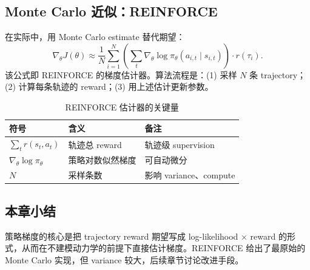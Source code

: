 \subsection{Monte Carlo 近似：REINFORCE}

在实际中，用 Monte Carlo estimate 替代期望：
$$\nabla_\theta J(\theta) \approx \frac{1}{N} \sum_{i=1}^{N} \left(\sum_t \nabla_\theta \log \pi_\theta(a_{i,t}\mid s_{i,t})\right) \cdot r(\tau_i).$$
该公式即 REINFORCE 的梯度估计器。算法流程是：(1) 采样 $N$ 条 trajectory；(2) 计算每条轨迹的 reward；(3) 用上述估计更新参数。

\begin{table}[H]
\centering
\small
\begin{tabular}{p{}p{}p{}}
\toprule
符号 & 含义 & 备注 \\
\midrule
$\sum_t r(s_t,a_t)$ & 轨迹总 reward & 轨迹级 supervision \\
$\nabla_\theta \log \pi_\theta$ & 策略对数似然梯度 & 可自动微分 \\
$N$ & 采样条数 & 影响 variance、compute \\
\bottomrule
\end{tabular}
\caption{REINFORCE 估计器的关键量}
\end{table}

\subsection{本章小结}

策略梯度的核心是把 trajectory reward 期望写成 log-likelihood × reward 的形式，从而在不建模动力学的前提下直接估计梯度。REINFORCE 给出了最原始的 Monte Carlo 实现，但 variance 较大，后续章节讨论改进手段。

